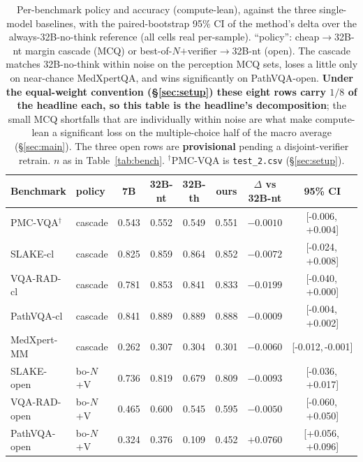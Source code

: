 \documentclass[conference]{IEEEtran}
\newcommand{\ci}[2]{{\footnotesize[#1,\,#2]}}
\begin{document}
\begin{table}[t]
\centering
\caption{Per-benchmark policy and accuracy (compute-lean), against the three single-model baselines, with the paired-bootstrap 95\% CI of the method's delta over the always-32B-no-think reference (all cells real per-sample). ``policy'': cheap$\to$32B-nt margin cascade (MCQ) or best-of-$N$$+$verifier$\to$32B-nt (open). The cascade matches 32B-no-think within noise on the perception MCQ sets, loses a little only on near-chance MedXpertQA, and wins significantly on PathVQA-open. \textbf{Under the equal-weight convention (\S\ref{sec:setup}) these eight rows carry $1/8$ of the headline each, so this table is the headline's decomposition}; the small MCQ shortfalls that are individually within noise are what make compute-lean a significant loss on the multiple-choice half of the macro average (\S\ref{sec:main}). The three open rows are \textbf{provisional} pending a disjoint-verifier retrain. $n$ as in Table~\ref{tab:bench}. $^{\dagger}$PMC-VQA is \texttt{test\_2.csv} (\S\ref{sec:setup}).}
\label{tab:perbench}
\footnotesize
\begin{tabular}{@{}llcccccc@{}}
\toprule
Benchmark & policy & 7B & 32B-nt & 32B-th & \textbf{ours} & $\Delta$ vs 32B-nt & 95\% CI \\
\midrule
PMC-VQA$^{\dagger}$ & cascade   & 0.543 & 0.552 & 0.549 & 0.551 & $-0.0010$ & \ci{-0.006}{+0.004} \\
SLAKE-cl       & cascade   & 0.825 & 0.859 & 0.864 & 0.852 & $-0.0072$ & \ci{-0.024}{+0.008} \\
VQA-RAD-cl     & cascade   & 0.781 & 0.853 & 0.841 & 0.833 & $-0.0199$ & \ci{-0.040}{+0.000} \\
PathVQA-cl     & cascade   & 0.841 & 0.889 & 0.889 & 0.888 & $-0.0009$ & \ci{-0.004}{+0.002} \\
MedXpert-MM    & cascade   & 0.262 & 0.307 & 0.304 & 0.301 & $-0.0060$ & \ci{-0.012}{-0.001} \\
SLAKE-open     & bo-$N$+V  & 0.736 & 0.819 & 0.679 & 0.809 & $-0.0093$ & \ci{-0.036}{+0.017} \\
VQA-RAD-open   & bo-$N$+V  & 0.465 & 0.600 & 0.545 & 0.595 & $-0.0050$ & \ci{-0.060}{+0.050} \\
PathVQA-open   & bo-$N$+V  & 0.324 & 0.376 & 0.109 & 0.452 & $\mathbf{+0.0760}$ & \ci{+0.056}{+0.096} \\
\bottomrule
\end{tabular}
\end{table}
\end{document}
